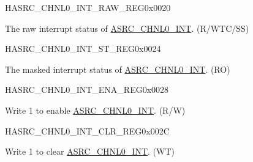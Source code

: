 \begin{register}{H}{ASRC\_CHNL0\_INT\_RAW\_REG}{0x0020}\label{regdesc:ASRCCHNL0INTRAWREG}
%
%
\regnewline%
\begin{regdesc}\begin{reglist}
\label{fielddesc:ASRCCHNL0OUTCNTEOFINTRAW}\item [ASRC\_CHNL0\_OUTCNT\_EOF\_INT\_RAW] The raw interrupt status of \hyperref[int:ASRCCHNL0INT] {ASRC\_CHNL0\_INT}. (R/WTC/SS)
\end{reglist}\end{regdesc}
\end{register}


\begin{register}{H}{ASRC\_CHNL0\_INT\_ST\_REG}{0x0024}\label{regdesc:ASRCCHNL0INTSTREG}
%
%
\regnewline%
\begin{regdesc}\begin{reglist}
\label{fielddesc:ASRCCHNL0OUTCNTEOFINTST}\item [ASRC\_CHNL0\_OUTCNT\_EOF\_INT\_ST] The masked interrupt status of \hyperref[int:ASRCCHNL0INT] {ASRC\_CHNL0\_INT}. (RO)
\end{reglist}\end{regdesc}
\end{register}


\begin{register}{H}{ASRC\_CHNL0\_INT\_ENA\_REG}{0x0028}\label{regdesc:ASRCCHNL0INTENAREG}
%
%
\regnewline%
\begin{regdesc}\begin{reglist}
\label{fielddesc:ASRCCHNL0OUTCNTEOFINTENA}\item [ASRC\_CHNL0\_OUTCNT\_EOF\_INT\_ENA] Write 1 to enable \hyperref[int:ASRCCHNL0INT] {ASRC\_CHNL0\_INT}. (R/W)
\end{reglist}\end{regdesc}
\end{register}


\begin{register}{H}{ASRC\_CHNL0\_INT\_CLR\_REG}{0x002C}\label{regdesc:ASRCCHNL0INTCLRREG}
%
%
\regnewline%
\begin{regdesc}\begin{reglist}
\label{fielddesc:ASRCCHNL0OUTCNTEOFINTCLR}\item [ASRC\_CHNL0\_OUTCNT\_EOF\_INT\_CLR] Write 1 to clear \hyperref[int:ASRCCHNL0INT] {ASRC\_CHNL0\_INT}.  (WT)
\end{reglist}\end{regdesc}
\end{register}


